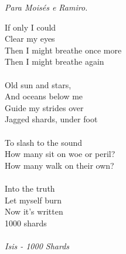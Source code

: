 \documentclass[12pt,twoside]{report}
\begin{document}
\newpage

\vspace*{0.75\textheight}
\begin{flushright}
  \emph{Para Moisés e Ramiro.}
\end{flushright}

\newpage

\vspace*{0.2\textheight}
{\noindent 
If only I could \\
Clear my eyes \\
Then I might breathe once more \\
Then I might breathe again \\
\vspace{0.2 cm} \\
Old sun and stars, \\
And oceans below me \\
Guide my strides over \\
Jagged shards, under foot \\
\vspace{0.2 cm} \\
To slash to the sound \\
How many sit on woe or peril? \\
How many walk on their own? \\
\vspace{0.2 cm} \\
Into the truth \\
Let myself burn \\
Now it's written \\
1000 shards \\
\vspace{0.2 cm} \\
\emph {Isis - 1000 Shards}
}
\end{document}
